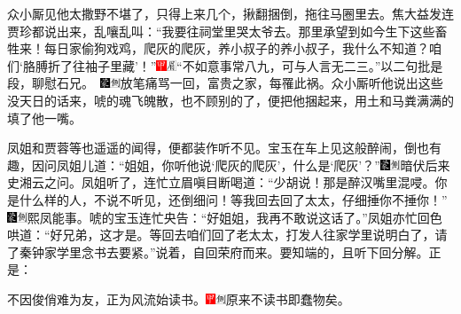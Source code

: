 众小厮见他太撒野不堪了，只得上来几个，揪翻捆倒，拖往马圈里去。焦大益发连贾珍都说出来，乱嚷乱叫：``我要往祠堂里哭太爷去。那里承望到如今生下这些畜牲来！每日家偷狗戏鸡，爬灰的爬灰，养小叔子的养小叔子，我什么不知道？咱们`胳膊折了往袖子里藏'！''{{\includegraphics[width=3mm]{../Images/00002}\includegraphics[width=3mm]{../Images/00010}\footnotesize \kaishu ``不如意事常八九，可与人言无二三。''以二句批是段，聊慰石兄。　}\includegraphics[width=3mm]{../Images/00006}\includegraphics[width=3mm]{../Images/00011}\footnotesize \kaishu 放笔痛骂一回，富贵之家，每罹此祸。}众小厮听他说出这些没天日的话来，唬的魂飞魄散，也不顾别的了，便把他捆起来，用土和马粪满满的填了他一嘴。

凤姐和贾蓉等也遥遥的闻得，便都装作听不见。宝玉在车上见这般醉闹，倒也有趣，因问凤姐儿道：``姐姐，你听他说`爬灰的爬灰'，什么是`爬灰'？''{\includegraphics[width=3mm]{../Images/00006}\includegraphics[width=3mm]{../Images/00011}\footnotesize \kaishu 暗伏后来史湘云之问。}凤姐听了，连忙立眉嗔目断喝道：``少胡说！那是醉汉嘴里混唚。你是什么样的人，不说不听见，还倒细问！等我回去回了太太，仔细捶你不捶你！''{\includegraphics[width=3mm]{../Images/00006}\includegraphics[width=3mm]{../Images/00011}\footnotesize \kaishu 熙凤能事。}唬的宝玉连忙央告：``好姐姐，我再不敢说这话了。''凤姐亦忙回色哄道：``好兄弟，这才是。等回去咱们回了老太太，打发人往家学里说明白了，请了秦钟家学里念书去要紧。''说着，自回荣府而来。要知端的，且听下回分解。正是：

不因俊俏难为友，正为风流始读书。{\includegraphics[width=3mm]{../Images/00002}\includegraphics[width=3mm]{../Images/00011}\footnotesize \kaishu 原来不读书即蠢物矣。}

